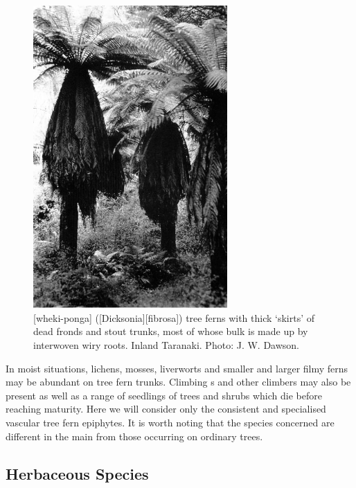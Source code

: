 \begin{figure}
	\includegraphics[width=0.66\textwidth]{graphics/figure54dicksonia-fibrosa.jpg}
	\centering
	\caption[Wheki-ponga (\emph{Dicksonia fibrosa}) tree ferns with thick `skirts' of dead fronds and stout trunks]{[wheki-ponga] ([Dicksonia][fibrosa]) tree ferns with thick `skirts' of dead fronds and stout trunks, most of whose bulk is made up by interwoven wiry roots.
	Inland Taranaki.
	Photo: J. W. Dawson.}%
	\label{fig:54dicksonia-fibrosa}
\end{figure}

In moist situations, lichens, mosses, liverworts and smaller and larger filmy ferns may be abundant on tree fern trunks.
Climbing s and other climbers may also be present as well as a range of seedlings of trees and shrubs which die before reaching maturity.
Here we will consider only the consistent and specialised vascular tree fern epiphytes.
It is worth noting that the species concerned are different in the main from those occurring on ordinary trees.

\subsection{Herbaceous Species}


